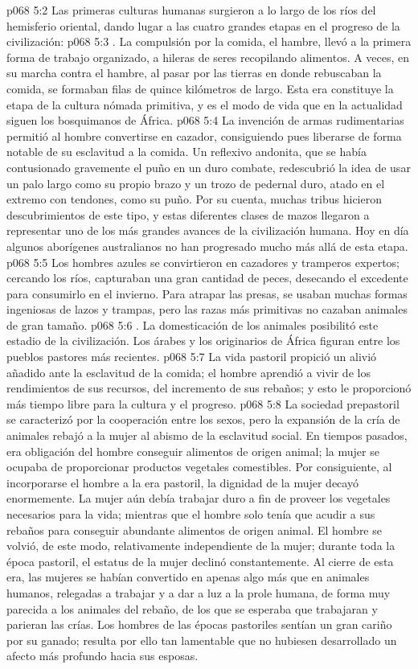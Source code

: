 \vs p068 5:2 Las primeras culturas humanas surgieron a lo largo de los ríos del hemisferio oriental, dando lugar a las cuatro grandes etapas en el progreso de la civilización:
\vs p068 5:3 . La compulsión por la comida, el hambre, llevó a la primera forma de trabajo organizado, a hileras de seres recopilando alimentos. A veces, en su marcha contra el hambre, al pasar por las tierras en donde rebuscaban la comida, se formaban filas de quince kilómetros de largo. Esta era constituye la etapa de la cultura nómada primitiva, y es el modo de vida que en la actualidad siguen los bosquimanos de África.
\vs p068 5:4  La invención de armas rudimentarias permitió al hombre convertirse en cazador, consiguiendo pues liberarse de forma notable de su esclavitud a la comida. Un reflexivo andonita, que se había contusionado gravemente el puño en un duro combate, redescubrió la idea de usar un palo largo como su propio brazo y un trozo de pedernal duro, atado en el extremo con tendones, como su puño. Por su cuenta, muchas tribus hicieron descubrimientos de este tipo, y estas diferentes clases de mazos llegaron a representar uno de los más grandes avances de la civilización humana. Hoy en día algunos aborígenes australianos no han progresado mucho más allá de esta etapa.
\vs p068 5:5 Los hombres azules se convirtieron en cazadores y tramperos expertos; cercando los ríos, capturaban una gran cantidad de peces, desecando el excedente para consumirlo en el invierno. Para atrapar las presas, se usaban muchas formas ingeniosas de lazos y trampas, pero las razas más primitivas no cazaban animales de gran tamaño.
\vs p068 5:6 . La domesticación de los animales posibilitó este estadio de la civilización. Los árabes y los originarios de África figuran entre los pueblos pastores más recientes.
\vs p068 5:7 La vida pastoril propició un alivió añadido ante la esclavitud de la comida; el hombre aprendió a vivir de los rendimientos de sus recursos, del incremento de sus rebaños; y esto le proporcionó más tiempo libre para la cultura y el progreso.
\vs p068 5:8 La sociedad prepastoril se caracterizó por la cooperación entre los sexos, pero la expansión de la cría de animales rebajó a la mujer al abismo de la esclavitud social. En tiempos pasados, era obligación del hombre conseguir alimentos de origen animal; la mujer se ocupaba de proporcionar productos vegetales comestibles. Por consiguiente, al incorporarse el hombre a la era pastoril, la dignidad de la mujer decayó enormemente. La mujer aún debía trabajar duro a fin de proveer los vegetales necesarios para la vida; mientras que el hombre solo tenía que acudir a sus rebaños para conseguir abundante alimentos de origen animal. El hombre se volvió, de este modo, relativamente independiente de la mujer; durante toda la época pastoril, el estatus de la mujer declinó constantemente. Al cierre de esta era, las mujeres se habían convertido en apenas algo más que en animales humanos, relegadas a trabajar y a dar a luz a la prole humana, de forma muy parecida a los animales del rebaño, de los que se esperaba que trabajaran y parieran las crías. Los hombres de las épocas pastoriles sentían un gran cariño por su ganado; resulta por ello tan lamentable que no hubiesen desarrollado un afecto más profundo hacia sus esposas.
